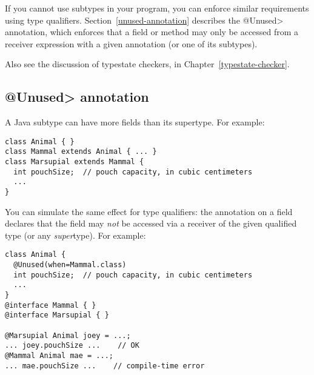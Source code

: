 If you cannot use subtypes in your program, you can enforce similar
requirements using type qualifiers.
Section~\ref{unused-annotation}
describes
the \<@Unused> annotation, which enforces that a field or method may only
be accessed from a receiver expression with a given annotation (or one of
its subtypes).


Also see the discussion of typestate checkers, in
Chapter~\ref{typestate-checker}.


\subsection{\<@Unused> annotation\label{unused-annotation}}

A Java subtype can have more fields than its supertype.  For example:

\begin{Verbatim}
class Animal { }
class Mammal extends Animal { ... }
class Marsupial extends Mammal {
  int pouchSize;  // pouch capacity, in cubic centimeters
  ...
}
\end{Verbatim}

You can simulate
the same effect for type qualifiers:  
the  annotation
on a field declares that the field may \emph{not} be accessed via a receiver of
the given qualified type (or any \emph{super}type).
For example:

\begin{Verbatim}
class Animal {
  @Unused(when=Mammal.class)
  int pouchSize;  // pouch capacity, in cubic centimeters
  ...
}
@interface Mammal { }
@interface Marsupial { }

@Marsupial Animal joey = ...;
... joey.pouchSize ...    // OK
@Mammal Animal mae = ...;
... mae.pouchSize ...    // compile-time error
\end{Verbatim}

